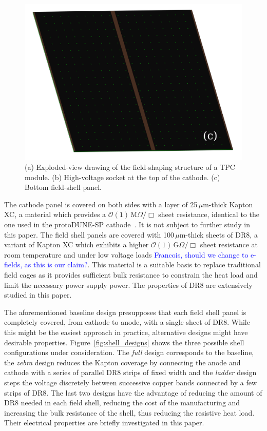 \documentclass[a4paper,12pt]{article}
\newcommand{\DR}{DR8}
\newcommand{\RI}[1]{\textcolor{blue}{#1}}
\begin{document}
\begin{figure}[htbp]
\begin{minipage}[b]{.4\textwidth}
\includegraphics[width=\linewidth]{field_shell_bottom.PNG}
\end{minipage}
\caption{(a) Exploded-view drawing of the field-shaping structure of a TPC module. (b) High-voltage socket at the top of the cathode. (c) Bottom field-shell panel.}
\label{fig:field_shell}
\end{figure}

The cathode panel is covered on both sides with a layer of 25\,$\mu$m-thick Kapton XC, a material which provides a $\mathcal{O}(1)\,$M$\Omega/\Box$ sheet resistance, identical to the one used in the protoDUNE-SP cathode~\cite{protodune_sp_tdr}. It is not subject to further study in this paper. The field shell panels are covered with 100\,$\mu$m-thick sheets of {\DR}, a variant of Kapton XC which exhibits a higher $\mathcal{O}(1)\,$G$\Omega/\Box$ sheet resistance at room temperature and under low voltage loads \RI{ Francois, should we change to e-fields, as this is our claim?}. This material is a suitable basis to replace traditional field cages as it provides sufficient bulk resistance to constrain the heat load and limit the necessary power supply power. The properties of {\DR} are extensively studied in this paper.%

The aforementioned baseline design presupposes that each field shell panel is completely covered, from cathode to anode, with a single sheet of {\DR}. While this might be the easiest approach in practice, alternative designs might have desirable properties. Figure~\ref{fig:shell_designs} shows the three possible shell configurations under consideration. The \textit{full} design corresponds to the baseline, the \textit{zebra} design reduces the Kapton coverage by connecting the anode and cathode with a series of parallel {\DR} strips of fixed width and the \textit{ladder} design steps the voltage discretely between successive copper bands connected by a few strips of {\DR}. The last two designs have the advantage of reducing the amount of {\DR} needed in each field shell, reducing the cost of the manufacturing and increasing the bulk resistance of the shell, thus reducing the resistive heat load. Their electrical properties are briefly investigated in this paper.
\end{document}
